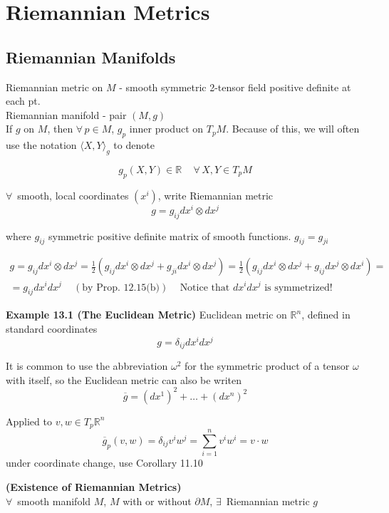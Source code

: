 \section{ Riemannian Metrics}

\subsection*{Riemannian Manifolds}

Riemannian metric on $M$ - smooth symmetric 2-tensor field positive definite at each pt.   \\

Riemannian manifold - pair $(M,g)$ \\

If $g$ on $M$, then $\forall \, p \in M$, $g_p$ inner product on $T_pM$.  Because of this, we will often use the notation $\langle X, Y\rangle_g$ to denote 

\[
g_p(X,Y) \in \mathbb{R} \quad \, \forall \, X, Y \in T_pM
\]

$\forall \, $ smooth, local coordinates $(x^i)$, write Riemannian metric
\[
g=g_{ij} dx^i \otimes dx^j
\]

where $g_{ij}$ symmetric positive definite matrix of smooth functions.  $g_{ij} = g_{ji}$

\[
\begin{gathered}
  g = g_{ij} dx^i \otimes dx^j = \frac{1}{2} (g_{ij} dx^i \otimes dx^j + g_{ji} dx^i \otimes dx^j ) = \frac{1}{2} (g_{ij} dx^i \otimes dx^j + g_{ij} dx^j \otimes dx^i ) = \\
  = g_{ij} dx^i dx^j \quad \, (\text{by Prop. 12.15(b)}) \quad \, \text{Notice that $dx^idx^j$ is symmetrized!}
\end{gathered}
\]


\textbf{Example 13.1 (The Euclidean Metric)}  Euclidean metric on $\mathbb{R}^n$, defined in standard coordinates
\[
g = \delta_{ij} dx^i dx^j
\]

It is common to use the abbreviation $\omega^2$ for the symmetric product of a tensor $\omega$ with itself, so the Euclidean metric can also be writen 
\[
\overline{g} = (dx^1)^2 + \dots + (dx^n)^2 
\]

Applied to $v,w \in T_p\mathbb{R}^n$ 
\[
\overline{g}_p(v,w) = \delta_{ij} v^i w^j = \sum_{i=1}^n v^i w^i = v\cdot w
\]
under coordinate change, use Corollary 11.10

\begin{proposition}[13.3] \textbf{(Existence of Riemannian Metrics)} \\
                          $\forall \, $ smooth manifold $M$, $M$ with or without $\partial M$, $\exists \, $ Riemannian metric $g$
\end{proposition}

